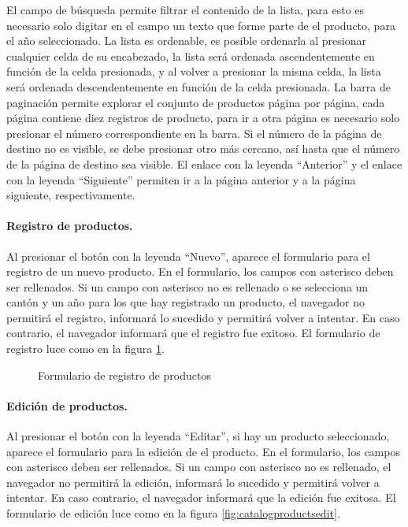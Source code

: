 \documentclass[a4paper, 9pt, conference]{article}              %
\begin{document}
El campo de b\'usqueda permite filtrar el contenido de la lista, para esto es necesario solo digitar en el campo un texto que forme parte de el producto, para el a\~no seleccionado. La lista es ordenable, es posible ordenarla al presionar cualquier celda de su encabezado, la lista ser\'a ordenada ascendentemente en funci\'on de la celda presionada, y al volver a presionar la misma celda, la lista ser\'a ordenada descendentemente en funci\'on de la celda presionada. La barra de paginaci\'on permite explorar el conjunto de productos p\'agina por p\'agina, cada p\'agina contiene diez registros de producto, para ir a otra p\'agina es necesario solo presionar el n\'umero correspondiente en la barra. Si el n\'umero de la p\'agina de destino no es visible, se debe presionar otro m\'as cercano, as\'i hasta que el n\'umero de la p\'agina de destino sea visible. El enlace con la leyenda ``Anterior'' y el enlace con la leyenda ``Siguiente'' permiten ir a la p\'agina anterior y a la p\'agina siguiente, respectivamente.

\paragraph{Registro de productos.}

Al presionar el bot\'on con la leyenda ``Nuevo'', aparece el formulario para el registro de un nuevo producto. En el formulario, los campos con asterisco deben ser rellenados. Si un campo con asterisco no es rellenado o se selecciona un cant\'on y un a\~no para los que hay registrado un producto, el navegador no permitir\'a el registro, informar\'a lo sucedido y permitir\'a volver a intentar. En caso contrario, el navegador informar\'a que el registro fue exitoso. El formulario de registro luce como en la figura \ref{fig:catalogproductsnew}.

\begin{figure}
	\centering
		\caption{Formulario de registro de productos}
	\label{fig:catalogproductsnew}
\end{figure}

\paragraph{Edici\'on de productos.}

Al presionar el bot\'on con la leyenda ``Editar'', si hay un producto seleccionado, aparece el formulario para la edici\'on de el producto. En el formulario, los campos con asterisco deben ser rellenados. Si un campo con asterisco no es rellenado, el navegador no permitir\'a la edici\'on, informar\'a lo sucedido y permitir\'a volver a intentar. En caso contrario, el navegador informar\'a que la edici\'on fue exitosa. El formulario de edici\'on luce como en la figura \ref{fig:catalogproductsedit}.
\end{document}
